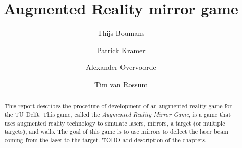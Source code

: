 \documentclass[]{report}
\title{Augmented Reality mirror game}
\author{Thijs Boumans \and Patrick Kramer \and
        Alexander Overvoorde \and Tim van Rossum}
\begin{document}
\maketitle

\begin{abstract}
This report describes the procedure of development of an augmented reality game 
for the TU Delft. This game, called the \emph{Augmented Reality Mirror Game}, 
is a game that uses augmented reality technology to simulate lasers, mirrors, 
a target (or multiple targets), and walls. The goal of this game is to use 
mirrors to deflect the laser beam coming from the laser to the target. 
TODO add description of the chapters.
\end{abstract}



\end{document}

